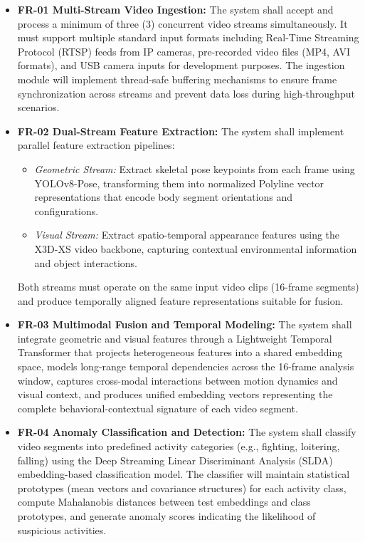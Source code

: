 \documentclass[12pt]{article}
\begin{document}
\begin{itemize}
    \item \textbf{FR-01 Multi-Stream Video Ingestion:} 
    The system shall accept and process a minimum of three (3) concurrent video streams simultaneously. It must support multiple standard input formats including Real-Time Streaming Protocol (RTSP) feeds from IP cameras, pre-recorded video files (MP4, AVI formats), and USB camera inputs for development purposes. The ingestion module will implement thread-safe buffering mechanisms to ensure frame synchronization across streams and prevent data loss during high-throughput scenarios.

    \item \textbf{FR-02 Dual-Stream Feature Extraction:}
    The system shall implement parallel feature extraction pipelines:
    \begin{itemize}
        \item \textit{Geometric Stream:} Extract skeletal pose keypoints from each frame using YOLOv8-Pose, transforming them into normalized Polyline vector representations that encode body segment orientations and configurations.
        \item \textit{Visual Stream:} Extract spatio-temporal appearance features using the X3D-XS video backbone, capturing contextual environmental information and object interactions.
    \end{itemize}
    Both streams must operate on the same input video clips (16-frame segments) and produce temporally aligned feature representations suitable for fusion.

    \item \textbf{FR-03 Multimodal Fusion and Temporal Modeling:}
    The system shall integrate geometric and visual features through a Lightweight Temporal Transformer that projects heterogeneous features into a shared embedding space, models long-range temporal dependencies across the 16-frame analysis window, captures cross-modal interactions between motion dynamics and visual context, and produces unified embedding vectors representing the complete behavioral-contextual signature of each video segment.

    \item \textbf{FR-04 Anomaly Classification and Detection:} 
    The system shall classify video segments into predefined activity categories (e.g., fighting, loitering, falling) using the Deep Streaming Linear Discriminant Analysis (SLDA) embedding-based classification model. The classifier will maintain statistical prototypes (mean vectors and covariance structures) for each activity class, compute Mahalanobis distances between test embeddings and class prototypes, and generate anomaly scores indicating the likelihood of suspicious activities.


\end{itemize}
\end{document}
